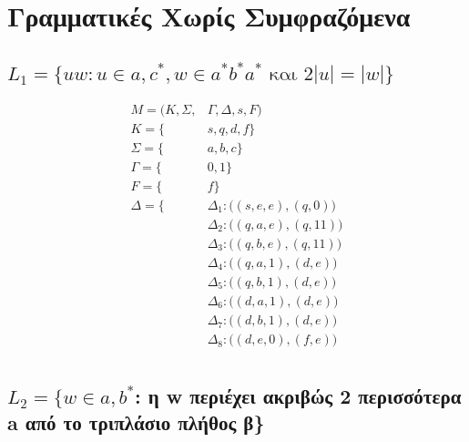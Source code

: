 \section{Γραμματικές Χωρίς Συμφραζόμενα}

\subsection{$L_1 = \{uw : u \in{a, c}^*, w \in a^*b^*a^* \text{ και } 2|u| = |w| \}$}

\begin{align*}
	M = (Κ, Σ,& Γ, Δ, s, F)\\
				K = \{&s, q, d, f\}\\
				Σ = \{&a, b, c\}\\
				Γ = \{&0, 1\}\\
				F  = \{&f\}\\
				Δ = \{& Δ_1 : \big(  (s, e, e), (q, 0) \big)\\
						 & Δ_2 : \big(  (q, a, e), (q, 11) \big)\\
						 & Δ_3 : \big(  (q, b, e), (q, 11) \big)\\
						 & Δ_4 : \big(  (q, a, 1), (d, e) \big)\\
						 & Δ_5 : \big(  (q, b, 1), (d, e) \big)\\
						 & Δ_6 : \big(  (d, a, 1), (d, e) \big)\\
						 & Δ_7 : \big(  (d, b, 1), (d, e) \big)\\
						 & Δ_8 : \big(  (d, e, 0), (f, e) \big)\\
\end{align*}


\subsection{$L_2 = \{w \in {a, b}^* $: η w περιέχει ακριβώς 2 περισσότερα a από το τριπλάσιο πλήθος β\}}


